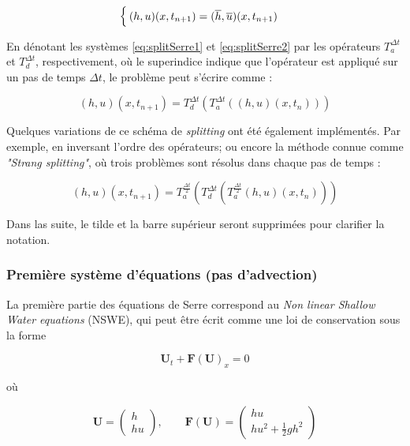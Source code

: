 \begin{equation*}
\begin{cases}
(h,u)(x,t_{n+1}) = (\overline{h},\overline{u})(x,t_{n+1})
\end{cases}
\end{equation*}

\indent En dénotant les systèmes \eqref{eq:splitSerre1} et  \eqref{eq:splitSerre2} par les opérateurs $T_a^{\Delta t}$ et $T_d^{\Delta t}$, respectivement, où le superindice indique que l'opérateur est appliqué sur un pas de temps  $\Delta t$, le problème peut s'écrire comme :

\begin{equation*}
(h,u)(x,t_{n+1}) = T_d^{\Delta t} \left( T_a^{\Delta t} \left((h,u)(x,t_n) \right) \right)
\end{equation*}

\indent Quelques variations de ce schéma de \emph{splitting} ont été également implémentés. Par exemple, en inversant l'ordre des opérateurs; ou encore la méthode connue comme \emph{"Strang splitting"}, où trois problèmes sont résolus dans chaque pas de temps :

\begin{equation*}
(h,u)(x,t_{n+1}) = T_a^{\frac{\Delta t}{2}} \left( T_d^{\Delta t} \left( T_a^{\frac{\Delta t}{2}} (h,u)(x,t_n) \right) \right)
\end{equation*}

\indent Dans las suite, le tilde et la barre supérieur seront supprimées pour clarifier la notation.

\subsubsection{Première système d'équations (pas d'advection)}

\indent La première partie des équations de Serre correspond au \emph{Non linear Shallow Water equations} (NSWE), qui peut être écrit comme une loi de conservation sous la forme

\begin{equation*}
	\boldsymbol{U}_t + \boldsymbol{F}(\boldsymbol{U})_x = 0
\end{equation*}

\noindent où

\begin{equation*}
	\boldsymbol{U} = \left(  \begin{array}{c} h \\ hu \end{array} \right), \qquad \boldsymbol{F}(\boldsymbol{U}) = \left(  \begin{array}{c} hu \\ hu^2 + \frac{1}{2}gh^2 \end{array} \right)
\end{equation*}

